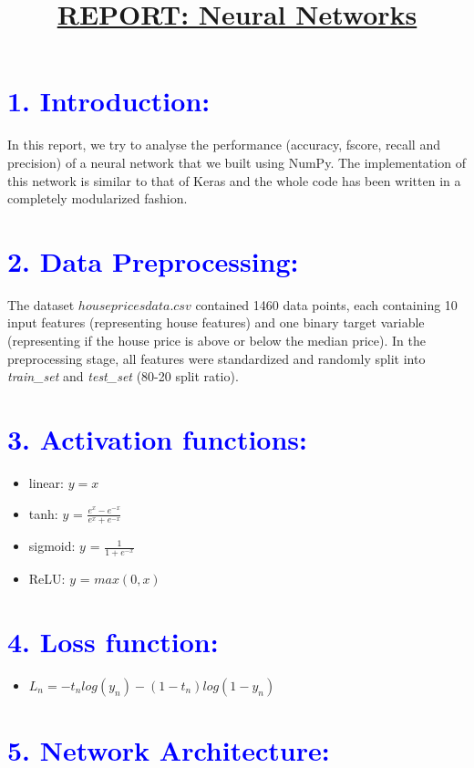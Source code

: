 \documentclass[a4paper,10pt,twocolumn]{article}
\title{\textbf{\underline{REPORT: Neural Networks}}}
\date{}
\author{}
\begin{document}
\maketitle
\section*{\textcolor{blue}{1. Introduction:}}
In this report, we try to analyse the performance (accuracy, fscore, recall and precision) of a neural network that we built using NumPy. The implementation of this network is similar to that of Keras and the whole code has been written in a completely modularized fashion.

\section*{\textcolor{blue}{2. Data Preprocessing:}}
The dataset $housepricesdata.csv$ contained 1460 data points, each containing 10 input features (representing house features) and one binary target variable (representing if the house price is above or below the median price). In the preprocessing stage, all features were standardized and randomly split into \textit{train\_set} and \textit{test\_set} (80-20 split ratio).

\section*{\textcolor{blue}{3. Activation functions:}}
\begin{itemize}
\item{linear: $y = x$}
\item{tanh: $y$ = $\frac{e^x - e^{-x}}{e^x + e^{-x}}$}
\item{sigmoid: $y$ = $\frac{1}{1 + e^{-x}}$}
\item{ReLU: $y$ = $max(0, x)$}
\end{itemize}

\section*{\textcolor{blue}{4. Loss function:}}
\begin{itemize}
\item{$L_n = -t_nlog(y_n)-(1-t_n)log(1-y_n)$} 
\end{itemize}

\section*{\textcolor{blue}{5. Network Architecture:}}
\end{document}
